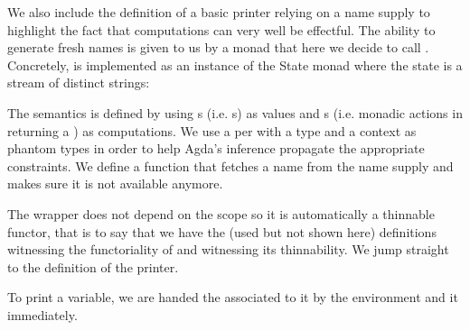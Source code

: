 \label{section:printing}
We also include the definition of a basic printer relying on a name
supply to highlight the fact that computations can very well be
effectful. The ability to generate fresh names is given to us by a
monad that here we decide to call . Concretely,  is implemented as an instance of the State monad where
the state is a stream of distinct strings:

\begin{agdasnippet}
\end{agdasnippet}

The  semantics is defined by using s (i.e. s)
as values and s (i.e. monadic actions in  returning a )
as computations. We use a per with a type and a context as phantom types
in order to help Agda's inference propagate the appropriate constraints. We define
a function  that fetches a name from the name supply and makes sure it is
not available anymore.

\begin{agdasnippet}
\end{agdasnippet}

\noindent
\begin{minipage}{0.95\textwidth}
\begin{minipage}{0.45\textwidth}
\end{minipage}
\begin{minipage}{0.5\textwidth}
\end{minipage}
\end{minipage}

The wrapper  does not depend on the scope  so it is
automatically a thinnable functor, that is to say that we have the (used
but not shown here) definitions  witnessing
the functoriality of  and  witnessing
its thinnability. We jump straight
to the definition of the printer.

To print a variable, we are handed the  associated to it by the
environment and  it immediately.

\begin{agdasnippet}
\end{agdasnippet}

